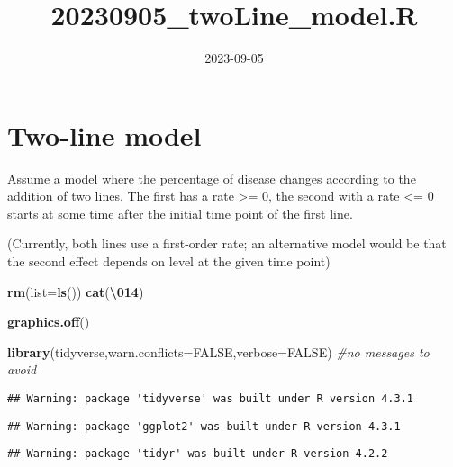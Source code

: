 \documentclass[
]{article}
\title{20230905\_twoLine\_model.R}
\author{}
\date{\vspace{-2.5em}2023-09-05}
\newenvironment{Shaded}{\begin{snugshade}}{\end{snugshade}}
\newcommand{\AttributeTok}[1]{\textcolor[rgb]{0.13,0.29,0.53}{#1}}
\newcommand{\CommentTok}[1]{\textcolor[rgb]{0.56,0.35,0.01}{\textit{#1}}}
\newcommand{\ConstantTok}[1]{\textcolor[rgb]{0.56,0.35,0.01}{#1}}
\newcommand{\FunctionTok}[1]{\textcolor[rgb]{0.13,0.29,0.53}{\textbf{#1}}}
\newcommand{\NormalTok}[1]{#1}
\newcommand{\SpecialCharTok}[1]{\textcolor[rgb]{0.81,0.36,0.00}{\textbf{#1}}}
\newcommand{\StringTok}[1]{\textcolor[rgb]{0.31,0.60,0.02}{#1}}
\begin{document}
\maketitle

\hypertarget{two-line-model}{%
\section{Two-line model}\label{two-line-model}}

Assume a model where the percentage of disease changes according to the
addition of two lines. The first has a rate \textgreater= 0, the second
with a rate \textless= 0 starts at some time after the initial time
point of the first line.

(Currently, both lines use a first-order rate; an alternative model
would be that the second effect depends on level at the given time
point)

\begin{Shaded}
\begin{Highlighting}[]
\FunctionTok{rm}\NormalTok{(}\AttributeTok{list=}\FunctionTok{ls}\NormalTok{())}
\FunctionTok{cat}\NormalTok{(}\StringTok{\textquotesingle{}}\SpecialCharTok{\textbackslash{}014}\StringTok{\textquotesingle{}}\NormalTok{)}
\end{Highlighting}
\end{Shaded}

\newpage{}

\begin{Shaded}
\begin{Highlighting}[]
\FunctionTok{graphics.off}\NormalTok{()}

\FunctionTok{library}\NormalTok{(}\StringTok{\textquotesingle{}tidyverse\textquotesingle{}}\NormalTok{,}\AttributeTok{warn.conflicts=}\ConstantTok{FALSE}\NormalTok{,}\AttributeTok{verbose=}\ConstantTok{FALSE}\NormalTok{) }\CommentTok{\#no messages to avoid}
\end{Highlighting}
\end{Shaded}

\begin{verbatim}
## Warning: package 'tidyverse' was built under R version 4.3.1
\end{verbatim}

\begin{verbatim}
## Warning: package 'ggplot2' was built under R version 4.3.1
\end{verbatim}

\begin{verbatim}
## Warning: package 'tidyr' was built under R version 4.2.2
\end{verbatim}
\end{document}
